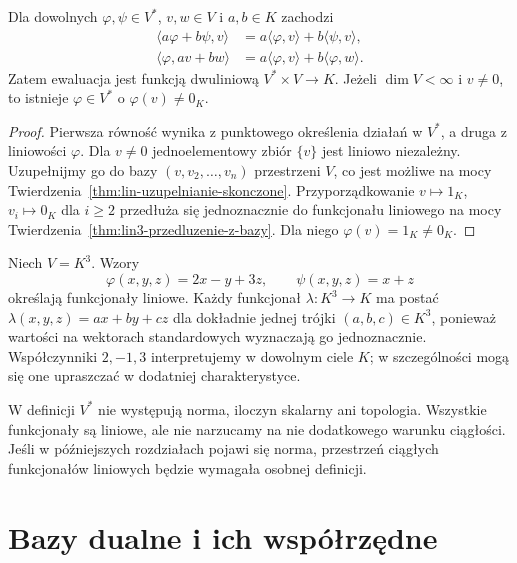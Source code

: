 \begin{stwierdzenie}
\label{prop:lin7-ewaluacja}
Dla dowolnych \(\varphi,\psi\in V^*\),
\(v,w\in V\) i \(a,b\in K\) zachodzi
\[
 \begin{aligned}
 \langle a\varphi+b\psi,v\rangle
   &=a\langle\varphi,v\rangle
     +b\langle\psi,v\rangle,\\
 \langle\varphi,av+bw\rangle
   &=a\langle\varphi,v\rangle
     +b\langle\varphi,w\rangle.
 \end{aligned}
\]
Zatem ewaluacja jest funkcją
dwuliniową \(V^*\times V\to K\).
Jeżeli \(\dim V<\infty\) i \(v\ne0\),
to istnieje \(\varphi\in V^*\)
o \(\varphi(v)\ne0_K\).
\end{stwierdzenie}
\begin{proof}
Pierwsza równość wynika z punktowego
określenia działań w \(V^*\),
a druga z liniowości \(\varphi\).
Dla \(v\ne0\) jednoelementowy zbiór
\(\{v\}\) jest liniowo niezależny.
Uzupełnijmy go do bazy
\((v,v_2,\ldots,v_n)\) przestrzeni \(V\),
co jest możliwe na mocy
Twierdzenia~\ref{thm:lin-uzupelnianie-skonczone}.
Przyporządkowanie
\(v\mapsto1_K\), \(v_i\mapsto0_K\)
dla \(i\geq2\) przedłuża się
jednoznacznie do funkcjonału liniowego
na mocy
Twierdzenia~\ref{thm:lin3-przedluzenie-z-bazy}.
Dla niego \(\varphi(v)=1_K\ne0_K\).
\end{proof}

\begin{przyklad}
\label{prz:lin7-wspolrzedne}
Niech \(V=K^3\). Wzory
\[
 \varphi(x,y,z)=2x-y+3z,\qquad
 \psi(x,y,z)=x+z
\]
określają funkcjonały liniowe.
Każdy funkcjonał
\(\lambda\colon K^3\to K\)
ma postać
\(\lambda(x,y,z)=ax+by+cz\)
dla dokładnie jednej trójki
\((a,b,c)\in K^3\), ponieważ
wartości na wektorach standardowych
wyznaczają go jednoznacznie.
Współczynniki \(2,-1,3\)
interpretujemy w dowolnym ciele \(K\);
w szczególności mogą się one
upraszczać w dodatniej charakterystyce.
\end{przyklad}

\begin{uwaga}
\label{rem:lin7-dual-algebraiczny}
W definicji \(V^*\) nie występują
norma, iloczyn skalarny ani topologia.
Wszystkie funkcjonały są liniowe,
ale nie narzucamy na nie dodatkowego
warunku ciągłości. Jeśli w późniejszych
rozdziałach pojawi się norma, przestrzeń
ciągłych funkcjonałów liniowych będzie
wymagała osobnej definicji.
\end{uwaga}

\section{Bazy dualne i ich współrzędne}
\label{sec:lin7-baza-dualna}

